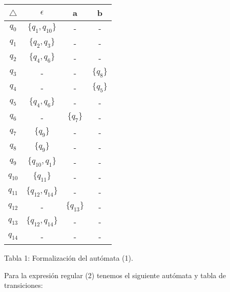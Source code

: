 \begin{center}
\begin{tabular}{c c c c}
\toprule \toprule
\hspace{20px} $\triangle$ \hspace{20px} & \hspace{20px} $\epsilon$ \hspace{20px} & \hspace{20px} a \hspace{20px} & \hspace{20px} b \hspace{20px}  \\
\midrule \midrule
$q_{0}$ & $\{q_{1}, q_{10}\}$ & - & - \\
\cmidrule{1-4}
$q_{1}$ & $\{q_{2}, q_{3}\}$ & - & - \\
\cmidrule{1-4}
$q_{2}$ & $\{q_{4}, q_{6}\}$ & - & - \\
\cmidrule{1-4}
$q_{3}$ & - & - & $\{q_{8}\}$ \\
\cmidrule{1-4}
$q_{4}$ & - & - & $\{q_{5}\}$ \\
\cmidrule{1-4}
$q_{5}$ & $\{q_{4}, q_{6}\}$ & - & - \\
\cmidrule{1-4}
$q_{6}$ & - & $\{q_{7}\}$ & - \\
\cmidrule{1-4}
$q_{7}$ & $\{q_{9}\}$ & - & - \\
\cmidrule{1-4}
$q_{8}$ & $\{q_{9}\}$ & - & - \\
\cmidrule{1-4}
$q_{9}$ & $\{q_{10}, q_{1}\}$ & - & - \\
\cmidrule{1-4}
$q_{10}$ & $\{q_{11}\}$ & - & - \\
\cmidrule{1-4}
$q_{11}$ & $\{q_{12}, q_{14}\}$ & - & - \\
\cmidrule{1-4}
$q_{12}$ & - & $\{q_{13}\}$ & - \\
\cmidrule{1-4}
$q_{13}$ & $\{q_{12}, q_{14}\}$ & - & - \\
\cmidrule{1-4}
$q_{14}$ & - & - & - \\
\bottomrule
\end{tabular}
\linebreak \linebreak Tabla 1: Formalización del autómata (1).
\end{center}

Para la expresión regular (2) tenemos el siguiente autómata y tabla de transiciones:

